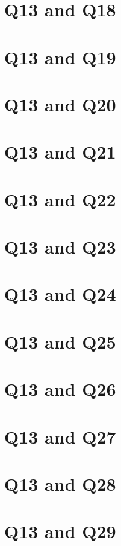 \documentclass{report}
\begin{document}
\section{Q13 and Q18}\clearpage
\section{Q13 and Q19}\clearpage
\section{Q13 and Q20}\clearpage
\section{Q13 and Q21}\clearpage
\section{Q13 and Q22}\clearpage
\section{Q13 and Q23}\clearpage
\section{Q13 and Q24}\clearpage
\section{Q13 and Q25}\clearpage
\section{Q13 and Q26}\clearpage
\section{Q13 and Q27}\clearpage
\section{Q13 and Q28}\clearpage
\section{Q13 and Q29}\clearpage
\end{document}

